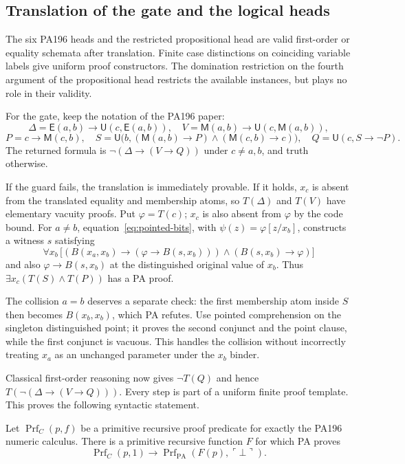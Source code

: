 \subsection{Translation of the gate and the logical heads}

The six PA196 heads and the restricted propositional head are valid
first-order or equality schemata after translation.  Finite case
distinctions on coinciding variable labels give uniform proof
constructors.  The domination restriction on the fourth argument of
the propositional head restricts the available instances, but plays no
role in their validity.

For the gate, keep the notation of the PA196 paper:
\[
 \Delta=\mathsf E(a,b)\to\mathsf U(c,\mathsf E(a,b)),
 \quad V=\mathsf M(a,b)\to\mathsf U(c,\mathsf M(a,b)),
\]
\[
 P=c\to\mathsf M(c,b),\quad
 S=\mathsf U\bigl(b,(\mathsf M(a,b)\to P)
                         \land(\mathsf M(c,b)\to c)\bigr),
 \quad Q=\mathsf U(c,S\to\neg P).
\]
The returned formula is $\neg(\Delta\to(V\to Q))$ under
$c\ne a,b$, and truth otherwise.

If the guard fails, the translation is immediately provable.  If it
holds, $x_c$ is absent from the translated equality and membership
atoms, so $T(\Delta)$ and $T(V)$ have elementary vacuity proofs.
Put $\varphi=T(c)$; $x_c$ is also absent from $\varphi$ by the code
bound.  For $a\ne b$, equation~\eqref{eq:pointed-bits}, with
$\psi(z)=\varphi[z/x_b]$, constructs a witness $s$ satisfying
\[
 \forall x_b\,
 \bigl[(B(x_a,x_b)\to(\varphi\to B(s,x_b)))
       \land(B(s,x_b)\to\varphi)\bigr]
\]
and also $\varphi\to B(s,x_b)$ at the distinguished original value
of $x_b$.  Thus $\exists x_c(T(S)\land T(P))$ has a PA proof.

The collision $a=b$ deserves a separate check: the first membership
atom inside $S$ then becomes $B(x_b,x_b)$, which PA refutes.  Use
pointed comprehension on the singleton distinguished point; it proves
the second conjunct and the point clause, while the first conjunct
is vacuous.  This handles the collision without incorrectly treating
$x_a$ as an unchanged parameter under the $x_b$ binder.

Classical first-order reasoning now gives $\neg T(Q)$ and hence
$T(\neg(\Delta\to(V\to Q)))$.  Every step is part of a uniform
finite proof template.  This proves the following syntactic statement.

\begin{lemma}\label{lem:reverse-proof}
Let $\operatorname{Prf}_{C}(p,f)$ be a primitive recursive proof
predicate for exactly the PA196 numeric calculus.  There is a
primitive recursive function $F$ for which PA proves
\[
 \operatorname{Prf}_{C}(p,1)
       \longrightarrow
 \operatorname{Prf}_{\mathrm{PA}}(F(p),\ulcorner\bot\urcorner).
\]
\end{lemma}

